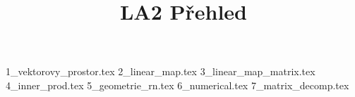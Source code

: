 \documentclass[a4paper]{article}
\begin{document}
\title{LA2 Přehled}

\maketitle
\pagebreak

{1_vektorovy_prostor.tex}
{2_linear_map.tex}
{3_linear_map_matrix.tex}
{4_inner_prod.tex}
{5_geometrie_rn.tex}
{6_numerical.tex}
{7_matrix_decomp.tex}
\end{document}
